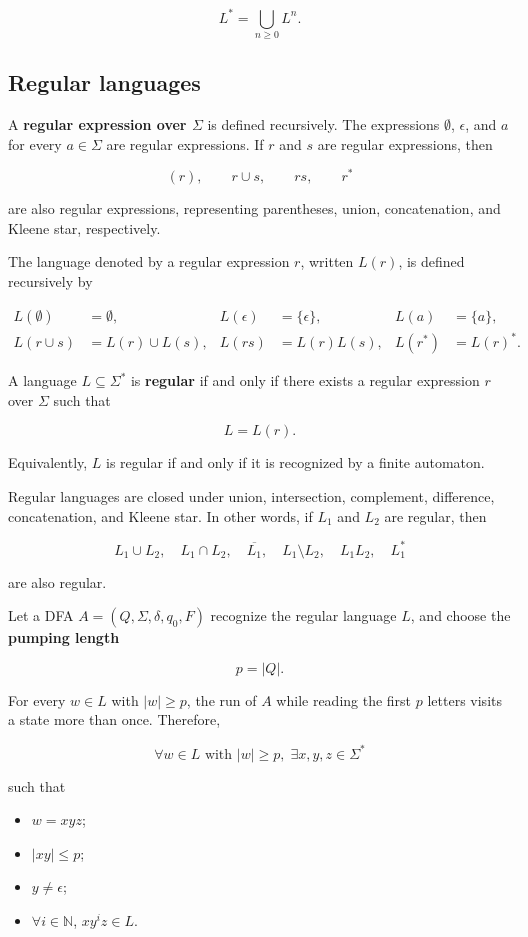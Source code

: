 \documentclass[11pt]{article}
\begin{document}
\[
L^*=\bigcup_{n\geq 0}L^n.
\]

\subsection{Regular languages}


A \textbf{regular expression over $\Sigma$} is defined recursively. The expressions $\emptyset$, $\epsilon$, and $a$ for every $a\in\Sigma$ are regular expressions. If $r$ and $s$ are regular expressions, then

\[
(r), \qquad r\cup s,\qquad rs,\qquad r^*
\]

are also regular expressions, representing parentheses,  union, concatenation, and Kleene star, respectively.

The language denoted by a regular expression $r$, written $L(r)$, is defined recursively by

\[
\begin{aligned}
L(\emptyset)&=\emptyset, &
L(\epsilon)&=\{\epsilon\}, &
L(a)&=\{a\},\\
L(r \cup s)&=L(r)\cup L(s), &
L(rs)&=L(r)L(s), &
L(r^*)&=L(r)^*.
\end{aligned}
\]

A language $L\subseteq\Sigma^*$ is \textbf{regular} if and only if there exists a regular expression $r$ over $\Sigma$ such that

\[
L=L(r).
\]

Equivalently, $L$ is regular if and only if it is recognized by a finite automaton.

Regular languages are closed under union, intersection, complement, difference, concatenation, and Kleene star. In other words, if $L_1$ and $L_2$ are regular, then

\[
L_1\cup L_2,\quad
L_1\cap L_2,\quad
\overline{L_1},\quad
L_1\setminus L_2,\quad
L_1L_2,\quad
L_1^*
\]

are also regular.

Let a DFA $A=(Q,\Sigma,\delta,q_0,F)$ recognize the regular language $L$, and choose the \textbf{pumping length}

\[
p=|Q|.
\]

For every $w\in L$ with $|w|\geq p$, the run of $A$ while reading the first $p$ letters visits a state more than once. Therefore,

\[
\forall w\in L\text{ with }|w|\geq p,\;
\exists x,y,z\in\Sigma^*
\]

such that

\begin{itemize}
\item $w=xyz$;
\item $|xy|\leq p$;
\item $y\neq \epsilon$;
\item $\forall i\in\mathbb{N}$, $xy^iz\in L$.

\end{itemize}
\end{document}
